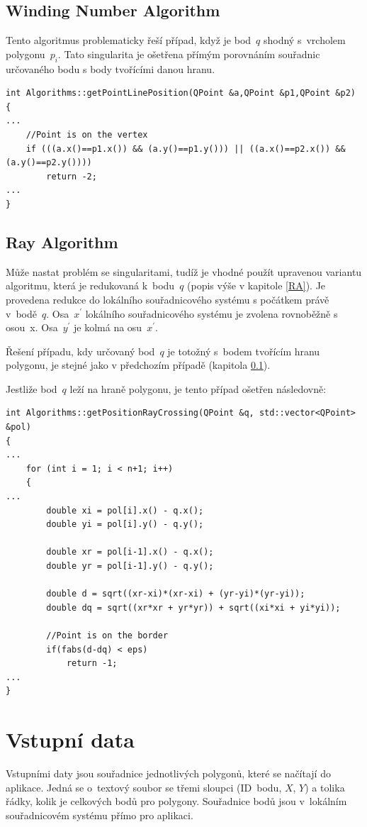 \documentclass[a4paper, 12pt, oneside, titlepage]{article} %
\begin{document}
\subsection{Winding Number Algorithm} \label{WNA_problem}
Tento algoritmus problematicky řeší případ, když je bod~$q$ shodný s~vrcholem polygonu~$p_i$. Tato singularita je ošetřena přímým porovnáním souřadnic určovaného bodu s body tvořícími danou hranu. 

\begin{verbatim}
int Algorithms::getPointLinePosition(QPoint &a,QPoint &p1,QPoint &p2)
{
...
    //Point is on the vertex
    if (((a.x()==p1.x()) && (a.y()==p1.y())) || ((a.x()==p2.x()) && (a.y()==p2.y())))
        return -2;
...
}
\end{verbatim}


\subsection{Ray Algorithm} \label{RA_problem}
Může nastat problém se singularitami, tudíž je vhodné použít upravenou variantu algoritmu, která je redukovaná k~bodu~$q$ (popis výše v kapitole \ref{RA}). Je provedena redukce do lokálního souřadnicového systému s počátkem právě v~bodě~$q$. Osa~$x^{'}$ lokálního souřadnicového systému je zvolena rovnoběžně s osou~x. Osa~$y^{'}$ je kolmá na osu~$x^{'}$. 

Řešení případu, kdy určovaný bod~$q$ je totožný s~bodem tvořícím hranu polygonu, je stejné jako v předchozím případě (kapitola \ref{WNA_problem}).

Jestliže bod~$q$ leží na hraně polygonu, je tento případ ošetřen následovně:
\begin{verbatim}
int Algorithms::getPositionRayCrossing(QPoint &q, std::vector<QPoint> &pol)
{
...
    for (int i = 1; i < n+1; i++)
    {
...
        double xi = pol[i].x() - q.x();
        double yi = pol[i].y() - q.y();

        double xr = pol[i-1].x() - q.x();
        double yr = pol[i-1].y() - q.y();

        double d = sqrt((xr-xi)*(xr-xi) + (yr-yi)*(yr-yi));
        double dq = sqrt((xr*xr + yr*yr)) + sqrt((xi*xi + yi*yi));

        //Point is on the border
        if(fabs(d-dq) < eps)
            return -1;
...
}

\end{verbatim}


\section{Vstupní data}
Vstupními daty jsou souřadnice jednotlivých polygonů, které se načítají do aplikace. Jedná se o~textový soubor se třemi sloupci (ID~bodu, $X$, $Y$) a tolika řádky, kolik je celkových bodů pro polygony. Souřadnice bodů jsou v~lokálním souřadnicovém systému přímo pro aplikaci.
\end{document}
